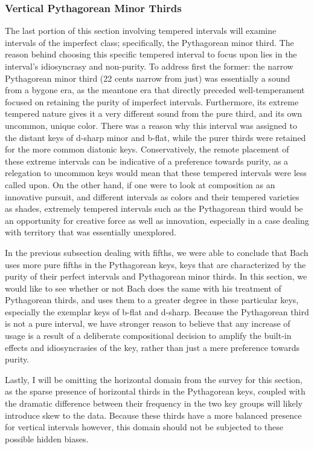     \subsubsection{Vertical Pythagorean Minor
Thirds}\label{vertical-pythagorean-minor-thirds}

The last portion of this section involving tempered intervals will
examine intervals of the imperfect class; specifically, the Pythagorean
minor third. The reason behind choosing this specific tempered interval
to focus upon lies in the interval's idiosyncrasy and non-purity. To
address first the former: the narrow Pythagorean minor third (22 cents
narrow from just) was essentially a sound from a bygone era, as the
meantone era that directly preceded well-temperament focused on
retaining the purity of imperfect intervals. Furthermore, its extreme
tempered nature gives it a very different sound from the pure third, and
its own uncommon, unique color. There was a reason why this interval was
assigned to the distant keys of d-sharp minor and b-flat, while the
purer thirds were retained for the more common diatonic keys.
Conservatively, the remote placement of these extreme intervals can be
indicative of a preference towards purity, as a relegation to uncommon
keys would mean that these tempered intervals were less called upon. On
the other hand, if one were to look at composition as an innovative
pursuit, and different intervals as colors and their tempered varieties
as shades, extremely tempered intervals such as the Pythagorean third
would be an opportunity for creative force as well as innovation,
especially in a case dealing with territory that was essentially
unexplored.

In the previous subsection dealing with fifths, we were able to conclude
that Bach uses more pure fifths in the Pythagorean keys, keys that are
characterized by the purity of their perfect intervals and Pythagorean
minor thirds. In this section, we would like to see whether or not Bach
does the same with his treatment of Pythagorean thirds, and uses them to
a greater degree in these particular keys, especially the exemplar keys
of b-flat and d-sharp. Because the Pythagorean third is not a pure
interval, we have stronger reason to believe that any increase of usage
is a result of a deliberate compositional decision to amplify the
built-in effects and idiosyncrasies of the key, rather than just a mere
preference towards purity.

Lastly, I will be omitting the horizontal domain from the survey for
this section, as the sparse presence of horizontal thirds in the
Pythagorean keys, coupled with the dramatic difference between their
frequency in the two key groups will likely introduce skew to the data.
Because these thirds have a more balanced presence for vertical
intervals however, this domain should not be subjected to these possible
hidden biases.

